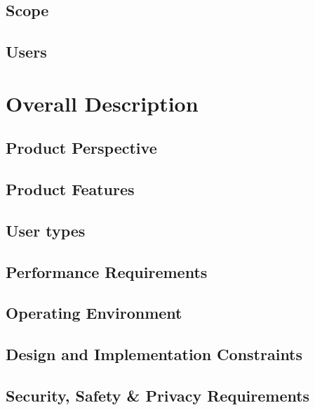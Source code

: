 \documentclass[a4paper,12pt]{article}
\begin{document}
\subsection{Scope}
\subsection{Users}
\section{Overall Description}
\subsection{Product Perspective}
\subsection{Product Features}

\subsection{User types}
\subsection{Performance Requirements}
\subsection{Operating Environment}
\subsection{Design and Implementation Constraints}
\subsection{Security, Safety & Privacy Requirements}
\end{document}
